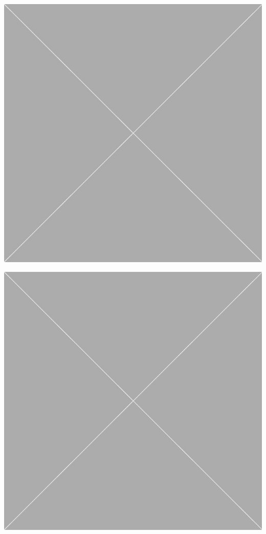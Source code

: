 \documentclass[10pt,oneside]{book}
\begin{document}
\begin{widefigure}
\centering
\begin{minipage}{.48\linewidth}
  \centering
  \includegraphics[width=0.9\linewidth]{Pictures/placeholder.jpg}
  \label{fig:graph1}
\end{minipage}%
\qquad
\begin{minipage}{.48\linewidth}
  \centering
  \includegraphics[width=0.9\linewidth]{Pictures/placeholder.jpg}
  \label{fig:graph2}
\end{minipage}
\end{widefigure}
\end{document}
